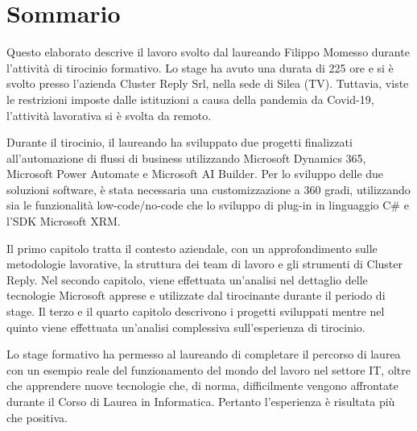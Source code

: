 \chapter*{Sommario} %
\label{sommario}

Questo elaborato descrive il lavoro svolto dal laureando Filippo Momesso durante l'attività di tirocinio formativo. Lo stage ha avuto una durata di 225 ore e si è svolto presso l'azienda Cluster Reply Srl, nella sede di Silea (TV). Tuttavia, viste le restrizioni imposte dalle istituzioni a causa della pandemia da Covid-19, l'attività lavorativa si è svolta da remoto.

Durante il tirocinio, il laureando ha sviluppato due progetti finalizzati all'automazione di flussi di business utilizzando Microsoft Dynamics 365, Microsoft Power Automate e Microsoft AI Builder. Per lo sviluppo delle due soluzioni software, è stata necessaria una customizzazione a \num{360} gradi, utilizzando sia le funzionalità low-code/no-code che lo sviluppo di plug-in in linguaggio C\# e l'SDK Microsoft XRM. 

Il primo capitolo tratta il contesto aziendale, con un approfondimento sulle metodologie lavorative, la struttura dei team di lavoro e gli strumenti di Cluster Reply. Nel secondo capitolo, viene effettuata un'analisi nel dettaglio delle tecnologie Microsoft apprese e utilizzate dal tirocinante durante il periodo di stage. 
Il terzo e il quarto capitolo descrivono i progetti sviluppati mentre nel quinto viene effettuata un'analisi complessiva sull'esperienza di tirocinio. 

Lo stage formativo ha permesso al laureando di completare il percorso di laurea con un esempio reale del funzionamento del mondo del lavoro nel settore IT, oltre che apprendere nuove tecnologie che, di norma, difficilmente vengono affrontate durante il Corso di Laurea in Informatica. Pertanto l'esperienza è risultata più che positiva. 
\newpage

